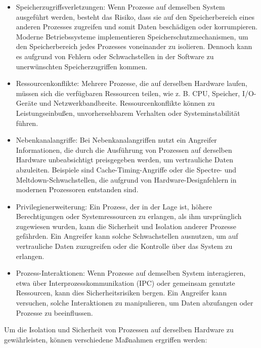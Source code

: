 \documentclass[../vs-script-first-v01.tex]{subfiles}
\begin{document}
\begin{itemize}
\item Speicherzugriffsverletzungen: Wenn Prozesse auf demselben System ausgeführt werden, besteht das Risiko, dass sie auf den Speicherbereich eines anderen Prozesses zugreifen und somit Daten beschädigen oder korrumpieren. Moderne Betriebssysteme implementieren Speicherschutzmechanismen, um den Speicherbereich jedes Prozesses voneinander zu isolieren. Dennoch kann es aufgrund von Fehlern oder Schwachstellen in der Software zu unerwünschten Speicherzugriffen kommen.
\item Ressourcenkonflikte: Mehrere Prozesse, die auf derselben Hardware laufen, müssen sich die verfügbaren Ressourcen teilen, wie z. B. CPU, Speicher, I/O-Geräte und Netzwerkbandbreite. Ressourcenkonflikte können zu Leistungseinbußen, unvorhersehbarem Verhalten oder Systeminstabilität führen.
\item Nebenkanalangriffe: Bei Nebenkanalangriffen nutzt ein Angreifer Informationen, die durch die Ausführung von Prozessen auf derselben Hardware unbeabsichtigt preisgegeben werden, um vertrauliche Daten abzuleiten. Beispiele sind Cache-Timing-Angriffe oder die Spectre- und Meltdown-Schwachstellen, die aufgrund von Hardware-Designfehlern in modernen Prozessoren entstanden sind.
\item Privilegienerweiterung: Ein Prozess, der in der Lage ist, höhere Berechtigungen oder Systemressourcen zu erlangen, als ihm ursprünglich zugewiesen wurden, kann die Sicherheit und Isolation anderer Prozesse gefährden. Ein Angreifer kann solche Schwachstellen ausnutzen, um auf vertrauliche Daten zuzugreifen oder die Kontrolle über das System zu erlangen.
\item Prozess-Interaktionen: Wenn Prozesse auf demselben System interagieren, etwa über Interprozesskommunikation (IPC) oder gemeinsam genutzte Ressourcen, kann dies Sicherheitsrisiken bergen. Ein Angreifer kann versuchen, solche Interaktionen zu manipulieren, um Daten abzufangen oder Prozesse zu beeinflussen.
\end{itemize}
Um die Isolation und Sicherheit von Prozessen auf derselben Hardware zu gewährleisten, können verschiedene Maßnahmen ergriffen werden:
\end{document}

